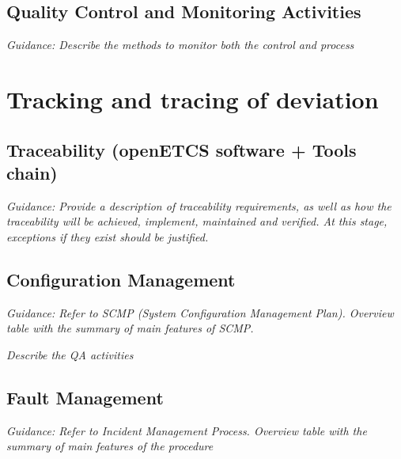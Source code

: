 \documentclass{template/openetcs_article}
\begin{document}
\subsection{Quality Control and Monitoring Activities}
\textit{Guidance: Describe the methods to monitor both the control and process}

\section{Tracking and tracing of deviation}


\subsection{Traceability (openETCS software + Tools chain)}
\textit{Guidance: Provide a description of traceability requirements, as well as how the traceability will be achieved, implement, maintained and verified. At this stage, exceptions if they exist should be justified.}

\subsection{Configuration Management}
\textit{Guidance: Refer to SCMP (System Configuration Management Plan). Overview table with the summary of main features of SCMP.}


\textit{Describe the QA activities}

\subsection{Fault Management}
\textit{Guidance: Refer to Incident Management Process. Overview table with the summary of main features of the procedure}

\end{document}
